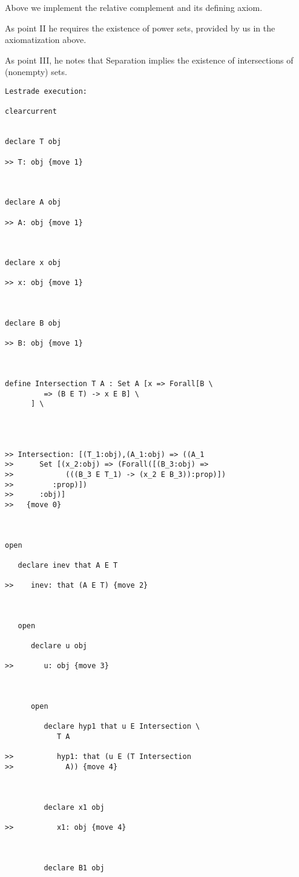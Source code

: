 \documentclass[12pt]{article}
\begin{document}
Above we implement the relative complement and its defining axiom.

As point II he requires the existence of power sets, provided by us in the axiomatization above. 

As point III, he notes that Separation implies the existence of intersections of (nonempty) sets.

\begin{verbatim}Lestrade execution:

clearcurrent


declare T obj

>> T: obj {move 1}



declare A obj

>> A: obj {move 1}



declare x obj

>> x: obj {move 1}



declare B obj

>> B: obj {move 1}



define Intersection T A : Set A [x => Forall[B \
         => (B E T) -> x E B] \
      ] \
   



>> Intersection: [(T_1:obj),(A_1:obj) => ((A_1
>>      Set [(x_2:obj) => (Forall([(B_3:obj) =>
>>            (((B_3 E T_1) -> (x_2 E B_3)):prop)])
>>         :prop)])
>>      :obj)]
>>   {move 0}



open

   declare inev that A E T

>>    inev: that (A E T) {move 2}



   open

      declare u obj

>>       u: obj {move 3}



      open

         declare hyp1 that u E Intersection \
            T A

>>          hyp1: that (u E (T Intersection
>>            A)) {move 4}



         declare x1 obj

>>          x1: obj {move 4}



         declare B1 obj


\end{verbatim}
\end{document}
